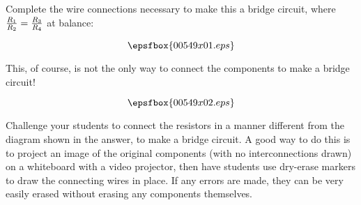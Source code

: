 

Complete the wire connections necessary to make this a bridge circuit, where ${R_1 \over R_2} = {R_3 \over R_4}$ at balance:

$$\epsfbox{00549x01.eps}$$

\vskip 20pt







This, of course, is not the only way to connect the components to make a bridge circuit!

$$\epsfbox{00549x02.eps}$$







Challenge your students to connect the resistors in a manner different from the diagram shown in the answer, to make a bridge circuit.  A good way to do this is to project an image of the original components (with no interconnections drawn) on a whiteboard with a video projector, then have students use dry-erase markers to draw the connecting wires in place.  If any errors are made, they can be very easily erased without erasing any components themselves.




